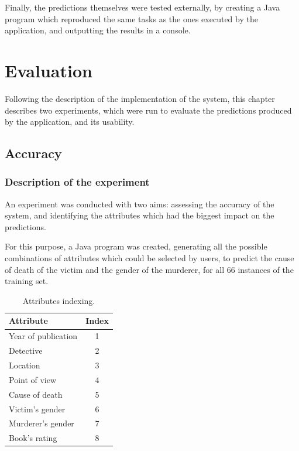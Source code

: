 \documentclass{mproj}
\begin{document}
Finally, the predictions themselves were tested externally, by creating a Java program which reproduced the same tasks as the ones executed by the application, and outputting the results in a console. 

\chapter{Evaluation}\label{evaluation}

Following the description of the implementation of the system, this chapter describes two experiments, which were run to evaluate the predictions produced by the application, and its usability.

\section{Accuracy}

\subsection*{Description of the experiment}

An experiment was conducted with two aims: assessing the accuracy of the system, and identifying the attributes which had the biggest impact on the predictions. 

For this purpose, a Java program was created, generating all the possible combinations of attributes which could be selected by users, to predict the cause of death of the victim and the gender of the murderer, for all 66 instances of the training set.

\begin{table}
	\centering
	\vspace{-10pt}
	\caption{Attributes indexing.}
	\begin{tabular}{ |l|c| }
		\hline
		\textbf{Attribute}   		& \textbf{Index}\\
		\hline		
		Year of publication         & 1    			\\ 
		Detective                   & 2				\\ Location                  	& 3				\\
		Point of view               & 4				\\
		Cause of death              & 5				\\
		Victim's gender             & 6				\\
		Murderer's gender           & 7				\\
		Book's rating               & 8				\\
		\hline
	\end{tabular}
	\label{tab:attribute}
	\vspace{-25pt}
\end{table}
\end{document}

